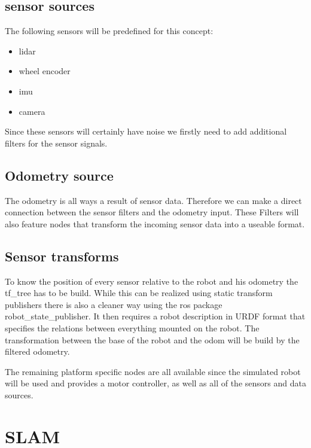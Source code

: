 \subsection{sensor sources}

The following sensors will be predefined for this concept:

\begin{itemize}
	\item lidar
	\item wheel encoder
	\item imu
	\item camera
\end{itemize}

Since these sensors will certainly have noise we firstly need to add additional filters for the sensor signals. 



\subsection{Odometry source}
The odometry is all ways a result of sensor data. Therefore we can make a direct connection between the sensor filters and the odometry input. These Filters will also feature nodes that transform the incoming sensor data into a useable format.

\subsection{Sensor transforms}
To know the position of every sensor relative to the robot and his odometry the tf\_tree has to be build. While this can be realized using static transform publishers there is also a cleaner way using the ros package robot\_state\_publisher. It then requires a robot description in URDF format that specifies the relations between everything mounted on the robot.
The transformation between the base of the robot and the odom will be build by the filtered odometry.

The remaining platform specific nodes are all available since the simulated robot will be used and provides a motor controller, as well as all of the sensors and data sources.

\section{SLAM}

